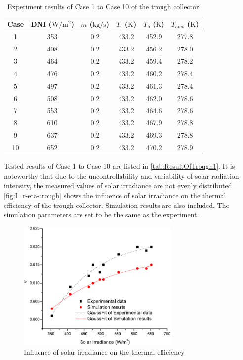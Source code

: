 \begin{table}[htbp]
	\caption{Experiment results of Case 1 to Case 10 of the trough collector}
	\centering
	\begin{tabular}{cccccc}
		\toprule
		Case	& DNI ($\mathrm{W/m^2}$)	&	$\dot{m}$ ($\mathrm{kg/s}$)			&	$T_i$ ($\mathrm{K}$)	&	$T_o$ ($\mathrm{K}$)		&	$T_{amb}$ ($\mathrm{K}$)\\
		\midrule
		1	&	353	&	0.2	&	433.2	&	452.9	&	277.8\\
		2	&	408	&	0.2	&	433.2	&	456.2	&	278.0\\
		3	&	464	&	0.2	&	433.2	&	459.4	&	278.2\\
		4	&	476	&	0.2	&	433.2	&	460.2	&	278.4\\
		5	&	497	&	0.2	&	433.2	&	461.3	&	278.4\\
		6	&	508	&	0.2	&	433.2	&	462.0	&	278.6\\
		7	&	553	&	0.2	&	433.2	&	464.6	&	278.6\\
		8	&	610	&	0.2	&	433.2	&	467.9	&	278.8\\
		9	&	637	&	0.2	&	433.2	&	469.3	&	278.8\\
		10	&	652	&	0.2	&	433.2	&	470.2	&	278.9\\
		\bottomrule
	\end{tabular}
	
	\label{tab:ResultOfTrough1}
\end{table}
Tested results of Case 1 to Case 10 are listed in \autoref{tab:ResultOfTrough1}. It is noteworthy that due to the uncontrollability and variability of solar radiation intensity, the measured values of solar irradiance are not evenly distributed.
\autoref{fig:I_r-eta-trough} shows the influence of solar irradiance on the thermal efficiency of the trough collector. Simulation results are also included. The simulation parameters are set to be the same as the experiment. 
\begin{figure}[!ht]
\centering
\includegraphics[width=0.7\textwidth]{fig/I_r-eta-trough}
\caption{Influence of solar irradiance on the thermal efficiency}
\label{fig:I_r-eta-trough}
\end{figure}

